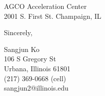 \documentclass{letter}
\begin{document}
\begin{letter}{
AGCO Acceleration Center\\
2001 S. First St. Champaign, IL}
\closing{Sincerely,
}

Sangjun Ko\\
106 S Gregory St\\
Urbana, Illinois 61801\\
(217) 369-0668 (cell)\\sangjun2@illinois.edu
\end{letter}
\end{document}
